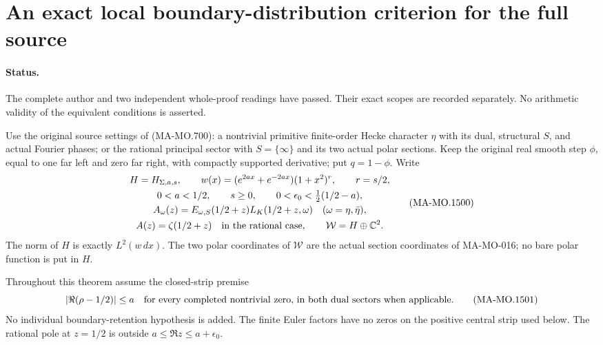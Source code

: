 \section{An exact local boundary-distribution criterion for the full source}
\label{sec:local-boundary-distribution-criterion}

\paragraph{Status.}
The complete author and two independent whole-proof readings
have passed.  Their exact scopes are recorded separately.
No arithmetic validity of the equivalent conditions is asserted.

Use the original source settings of (MA-MO.700): a nontrivial
primitive finite-order Hecke character $\eta$ with its dual,
structural $S$, and actual Fourier phases; or the rational principal
sector with $S=\{\infty\}$ and its two actual polar sections.
Keep the original real smooth step $\phi$, equal to one far left
and zero far right, with compactly supported derivative; put
$q=1-\phi$.
Write
\[
\begin{gathered}
 H=H_{\Sigma,a,s},\qquad
 w(x)=(e^{2ax}+e^{-2ax})(1+x^2)^r,\qquad r=s/2,\\
 0<a<1/2,\qquad s\ge0,\qquad
 0<\epsilon_0<\tfrac12(1/2-a),\\
 A_\omega(z)=E_{\omega,S}(1/2+z)L_K(1/2+z,\omega)
       \quad(\omega=\eta,\bar\eta),\\
 A(z)=\zeta(1/2+z)\quad\hbox{in the rational case},\qquad
 \mathcal W=H\oplus\mathbb C^2 .
\end{gathered}
\tag{MA-MO.1500}
\]
The norm of $H$ is exactly $L^2(w\,dx)$.  The two polar
coordinates of $\mathcal W$ are the actual section coordinates
of MA-MO-016; no bare polar function is put in $H$.

Throughout this theorem assume the closed-strip premise
\[
 |\Re(\rho-1/2)|\le a
 \quad\hbox{for every completed nontrivial zero, in both
 dual sectors when applicable}.
\tag{MA-MO.1501}
\]
No individual boundary-retention hypothesis is added.
The finite Euler factors have no zeros on the positive
central strip used below.  The rational pole at $z=1/2$
is outside $a\le\Re z\le a+\epsilon_0$.

